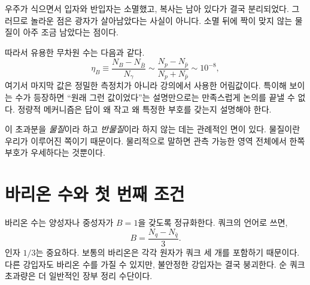 \begin{classroomqa}
\end{classroomqa}

우주가 식으면서 입자와 반입자는 소멸했고, 복사는 남아 있다가 결국 분리되었다. 그러므로 놀라운 점은 광자가 살아남았다는 사실이 아니다. 소멸 뒤에 짝이 맞지 않는 물질이 아주 조금 남았다는 점이다.

따라서 유용한 무차원 수는 다음과 같다.
\begin{equation}
\eta_B
\equiv
\frac{N_B-N_{\bar B}}{N_\gamma}
\sim
\frac{N_p-N_{\bar p}}{N_p+N_{\bar p}}
\sim 10^{-8},
\label{eq:c08-baryon-asymmetry}
\end{equation}
여기서 마지막 값은 정밀한 측정치가 아니라 강의에서 사용한 어림값이다. 특이해 보이는 수가 등장하면 ``원래 그런 값이었다''는 설명만으로는 만족스럽게 논의를 끝낼 수 없다. 정량적 메커니즘은 답이 왜 작고 왜 특정한 부호를 갖는지 설명해야 한다.

이 초과분을 \emph{물질}이라 하고 \emph{반물질}이라 하지 않는 데는 관례적인 면이 있다. 물질이란 우리가 이루어진 쪽이기 때문이다. 물리적으로 말하면 관측 가능한 영역 전체에서 한쪽 부호가 우세하다는 것뿐이다.

\section{바리온 수와 첫 번째 조건}

바리온 수는 양성자나 중성자가 \(B=1\)을 갖도록 정규화한다. 쿼크의 언어로 쓰면,
\begin{equation}
B=\frac{N_q-N_{\bar q}}{3}.
\label{eq:c08-baryon-number}
\end{equation}
인자 \(1/3\)는 중요하다. 보통의 바리온은 각각 원자가 쿼크 세 개를 포함하기 때문이다. 다른 강입자도 바리온 수를 가질 수 있지만, 불안정한 강입자는 결국 붕괴한다. 순 쿼크 초과량은 더 일반적인 장부 정리 수단이다.

\begin{classroomqa}
\end{classroomqa}


